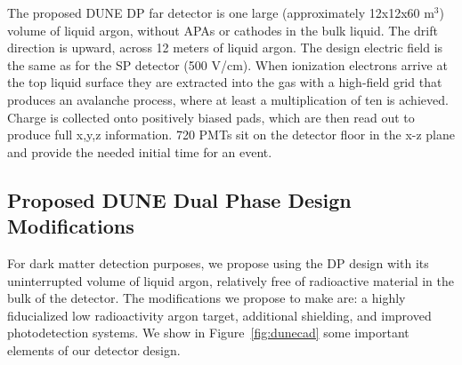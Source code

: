 \documentclass[a4paper,11pt]{article}
\begin{document}
The proposed DUNE DP far detector is one large (approximately 12x12x60 m$^3$) volume of liquid argon, without APAs or cathodes in the bulk liquid. The drift direction is upward, across 12 meters of liquid argon. The design electric field is the same as for the SP detector (500 V/cm). When ionization electrons arrive at the top liquid surface they are extracted into the gas with a high-field grid that produces an avalanche process, where at least a multiplication of ten is achieved. Charge is collected onto positively biased pads, which are then read out to produce full x,y,z information. 720 PMTs sit on the detector floor in the x-z plane and provide the needed initial time for an event.

\subsection{Proposed DUNE Dual Phase Design Modifications }
For dark matter detection purposes, we propose using the DP design with its uninterrupted volume of liquid argon, relatively free of radioactive material in the bulk of the detector. The modifications we propose to make are: a highly fiducialized low radioactivity argon target, additional shielding, and improved photodetection systems. We show in Figure~\ref{fig:dunecad} some important elements of our detector design.
\end{document}
